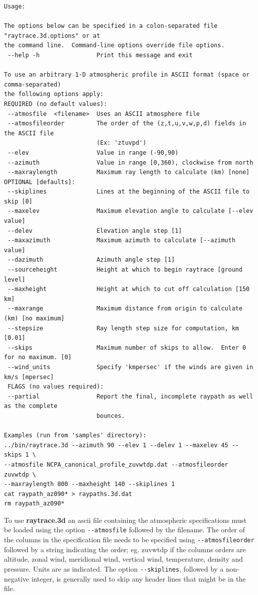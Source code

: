 \begin{verbatim}
Usage: 

The options below can be specified in a colon-separated file "raytrace.3d.options" or at 
the command line.  Command-line options override file options.
 --help -h                Print this message and exit

To use an arbitrary 1-D atmospheric profile in ASCII format (space or comma-separated) 
the following options apply:
REQUIRED (no default values):
 --atmosfile  <filename>  Uses an ASCII atmosphere file
 --atmosfileorder         The order of the (z,t,u,v,w,p,d) fields in the ASCII file 
                          (Ex: 'ztuvpd')
 --elev                   Value in range (-90,90)
 --azimuth                Value in range [0,360), clockwise from north
 --maxraylength           Maximum ray length to calculate (km) [none]
OPTIONAL [defaults]:
 --skiplines              Lines at the beginning of the ASCII file to skip [0]
 --maxelev                Maximum elevation angle to calculate [--elev value]
 --delev                  Elevation angle step [1]
 --maxazimuth             Maximum azimuth to calculate [--azimuth value]
 --dazimuth               Azimuth angle step [1]
 --sourceheight           Height at which to begin raytrace [ground level]
 --maxheight              Height at which to cut off calculation [150 km]
 --maxrange               Maximum distance from origin to calculate (km) [no maximum]
 --stepsize               Ray length step size for computation, km [0.01]
 --skips                  Maximum number of skips to allow.  Enter 0 for no maximum. [0]
 --wind_units             Specify 'kmpersec' if the winds are given in km/s [mpersec]
 FLAGS (no values required):
 --partial                Report the final, incomplete raypath as well as the complete 
                          bounces.

Examples (run from 'samples' directory):
../bin/raytrace.3d --azimuth 90 --elev 1 --delev 1 --maxelev 45 --skips 1 \
--atmosfile NCPA_canonical_profile_zuvwtdp.dat --atmosfileorder zuvwtdp \
--maxraylength 800 --maxheight 140 --skiplines 1
cat raypath_az090* > raypaths.3d.dat
rm raypath_az090*
\end{verbatim}

To use {\bf raytrace.3d} an ascii file containing the atmospheric specifications must be loaded using the option \verb+--atmosfile+ followed by the filename. The order of the columns in the specification file needs to be specified using \verb+--atmosfileorder+ followed by a string indicating the order; eg. zuvwtdp if the columns orders are altitude, zonal wind, meridional wind, vertical wind, temperature, density and pressure. Units are as indicated. The option \verb+--skiplines+, followed by a non-negative integer, is generally used to skip any header lines that might be in the file.

